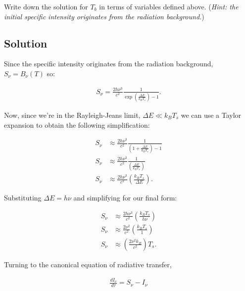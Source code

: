 \documentclass[12pt]{article}
\begin{document}
Write down the solution for $T_b$ in terms of variables defined above. (\textit{Hint: the initial specific intensity originates from the radiation background.})


\subsection*{Solution}

Since the specific intensity originates from the radiation background, $S_\nu = B_\nu(T)$ so:

\begin{align*}
S_\nu = \frac{2h\nu^3}{c^2}\frac{1}{\exp\left(\frac{\Delta E}{k_BT_s}\right)-1}.
\end{align*}

Now, since we're in the Rayleigh-Jeans limit, $\Delta E \ll k_BT_s$ we can use a Taylor expansion to obtain the following simplification:

\begin{equation*}
\begin{split}
S_\nu &\approx \frac{2h\nu^3}{c^2}\frac{1}{\left(1+\frac{\Delta E}{k_BT_s}\right)-1}\\
S_\nu &\approx \frac{2h\nu^3}{c^2}\frac{1}{\left(\frac{\Delta E}{k_BT_s}\right)}\\
S_\nu &\approx \frac{2h\nu^3}{c^2}\left(\frac{k_BT_s}{\Delta E}\right).
\end{split}
\end{equation*}

Substituting $\Delta E=h\nu$ and simplifying for our final form:

\begin{equation*}
\begin{split}
S_\nu &\approx \frac{2h\nu^3}{c^2}\left(\frac{k_BT_s}{h\nu}\right)\\
S_\nu &\approx \frac{2\nu^2}{c^2}\left(\frac{k_BT_s}{1}\right)\\
S_\nu &\approx \left(\frac{2\nu^2k_B}{c^2}\right)T_s.
\end{split}
\end{equation*}

Turning to the canonical equation of radiative transfer,

\begin{align*}
\frac{dI_\nu}{d\tau} = S_\nu - I_\nu
\end{align*}
\end{document}
